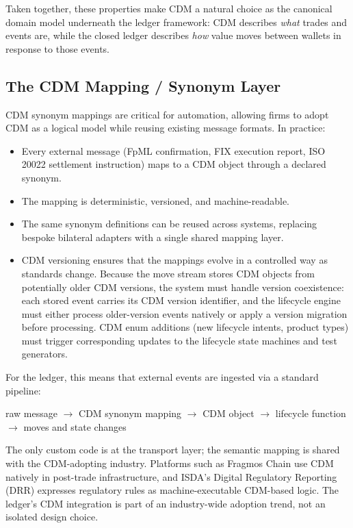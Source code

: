 \documentclass[11pt,a4paper]{article}
\begin{document}
Taken together, these properties make CDM a natural choice as the canonical domain model underneath the ledger framework: CDM describes \textit{what} trades and events are, while the closed ledger describes \textit{how} value moves between wallets in response to those events.

\subsection{The CDM Mapping / Synonym Layer}

CDM synonym mappings are critical for automation, allowing firms to adopt CDM as a logical model while reusing existing message formats. In practice:

\begin{itemize}[nosep]
\item Every external message (FpML confirmation, FIX execution report, ISO 20022 settlement instruction) maps to a CDM object through a declared synonym.
\item The mapping is deterministic, versioned, and machine-readable.
\item The same synonym definitions can be reused across systems, replacing bespoke bilateral adapters with a single shared mapping layer.
\item CDM versioning ensures that the mappings evolve in a controlled way as standards change. Because the move stream stores CDM objects from potentially older CDM versions, the system must handle version coexistence: each stored event carries its CDM version identifier, and the lifecycle engine must either process older-version events natively or apply a version migration before processing. CDM enum additions (new lifecycle intents, product types) must trigger corresponding updates to the lifecycle state machines and test generators.
\end{itemize}

For the ledger, this means that external events are ingested via a standard pipeline:

\begin{center}
raw message $\to$ CDM synonym mapping $\to$ CDM object $\to$ lifecycle function $\to$ moves and state changes
\end{center}

The only custom code is at the transport layer; the semantic mapping is shared with the CDM-adopting industry. Platforms such as Fragmos Chain use CDM natively in post-trade infrastructure, and ISDA's Digital Regulatory Reporting (DRR) expresses regulatory rules as machine-executable CDM-based logic. The ledger's CDM integration is part of an industry-wide adoption trend, not an isolated design choice.
\end{document}
